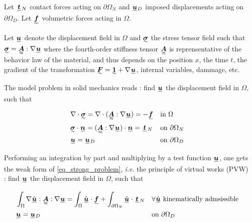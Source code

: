 \documentclass[fleqn]{article}
\begin{document}
        Let $\tensori{t}\subscript{N}$ contact forces acting on $\partial \Omega_N$ and $\tensori{u}\subscript{D}$ imposed displacements acting on $\partial \Omega_D$. Let $\tensori{f}$ volumetric forces acting in $\Omega$.
        \par

        Let $\tensori{u}$ denote the displacement field in $\Omega$ and $\tensorii{\sigma}$ the stress tensor field such that $\tensorii{\sigma} = \tensoriv{A} : \nabla \tensori{u}$ where the fourth-order stiffness tensor $\tensoriv{A}$ is reprensentative of the behavior law of the material, and thus depends on the position $x$, the time $t$, the gradient of the transformation $\tensorii{F} = \tensorii{1} + \nabla \tensori{u}$, internal variables, dammage, etc.

        The model problem in solid mechanics reads : find $\tensori{u}$ the displacement field in $\Omega$, such that

        \begin{equation}
            \label{eq_strong_problem}
            \begin{aligned}
                & \nabla \cdot \tensorii{\sigma} = \nabla \cdot (\tensoriv{A} : \nabla \tensori{u}) =  - \tensori{f}
                && \mbox{in $\Omega$}
                \\
                & \tensorii{\sigma} \cdot \tensori{n} = (\tensoriv{A} : \nabla \tensori{u}) \cdot \tensori{n} = \tensori{t}\subscript{N}
                && \mbox{on $\partial \Omega_N$}
                \\
                & \tensori{u} = \tensori{u} \subscript{D}
                && \mbox{on $\partial \Omega_D$}
            \end{aligned}
        \end{equation}
        \par

        Performing an integration by part and multiplying by a test function $\tensori{u}$, one gets the weak form of \eqref{eq_strong_problem}, \textit{i.e.} the principle of virtual works (PVW) : find $\tensori{u}$ the displacement field in $\Omega$, such that

        \begin{equation}
            \label{eq_weak_problem}
            \begin{aligned}
                & \int_{\Omega} \nabla \hat{\tensori{u}} : \tensoriv{A} : \nabla \tensori{u} = \int_{\Omega} \hat{\tensori{u}} \cdot \tensori{f} + \int_{\partial \Omega_N} \hat{\tensori{u}} \cdot \tensori{t}\subscript{N}
                &&
                \forall \hat{\tensori{u}} \mbox{ kinematically admsissible}
                \\
                & \tensori{u} = \tensori{u} \subscript{D}
                &&
                \mbox{on $\partial \Omega_D$}
            \end{aligned}
        \end{equation}
  
\end{document}
